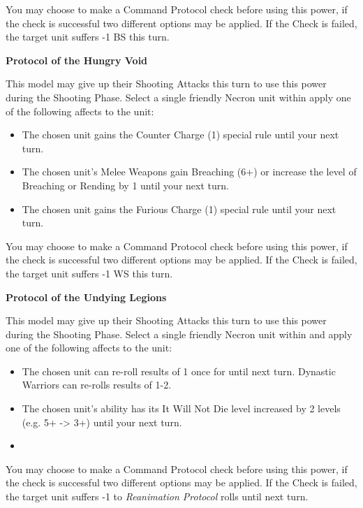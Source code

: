 \begin{multicols}{2}
You may choose to make a Command Protocol check before using this power, if the check is successful two different options may be applied. If the Check is failed, the target unit suffers -1 BS this turn.

\textbf{Protocol of the Hungry Void}

This model may give up their Shooting Attacks this turn to use this power during the Shooting Phase. Select a single friendly Necron unit within  apply one of the following affects to the unit:

\begin{itemize}
	\itemsep 0pt
	\item The chosen unit gains the Counter Charge (1) special rule until your next turn.
	\item The chosen unit's Melee Weapons gain Breaching (6+) or increase the level of Breaching or Rending by 1 until your next turn.
	\item The chosen unit gains the Furious Charge (1) special rule until your next turn.
\end{itemize}

You may choose to make a Command Protocol check before using this power, if the check is successful two different options may be applied. If the Check is failed, the target unit suffers -1 WS this turn.

\textbf{Protocol of the Undying Legions}

This model may give up their Shooting Attacks this turn to use this power during the Shooting Phase. Select a single friendly Necron unit within  and apply one of the following affects to the unit:

\begin{itemize}
	\itemsep 0pt
	\item The chosen unit can re-roll results of 1 once for  until next turn. Dynastic Warriors can re-rolls results of 1-2.
	\item The chosen unit's  ability has its It Will Not Die level increased by 2 levels (e.g. 5+ -> 3+) until  your next turn.
	\item 
\end{itemize}

You may choose to make a Command Protocol check before using this power, if the check is successful two different options may be applied. If the Check is failed, the target unit suffers -1 to \textit{Reanimation Protocol} rolls until next turn.


\end{multicols}
